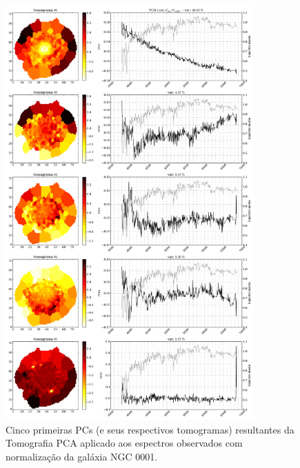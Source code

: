 \begin{figure}
    \includegraphics[width=0.85\textwidth]{figuras/K0008-tomo-obs-norm.pdf}
    \caption[Tomogramas de 1 a 5 para o cubo $F_{obs}$ norm. - NGC 0001.]
    {Cinco primeiras PCs (e seus respectivos tomogramas) resultantes da Tomografia PCA aplicado aos espectros
    observados com normalização da galáxia NGC 0001.}
    \label{fig:K0008tomofobsnorm}
\end{figure}

